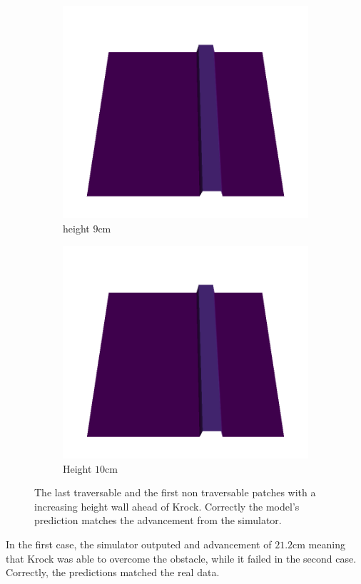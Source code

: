 \begin{figure}[H]
\begin{subfigure}[b]{0.33\textwidth}
    \end{subfigure}   
    \begin{subfigure}[b]{0.33\textwidth}
        \includegraphics[width=\linewidth]{../img/5/custom_patches/walls_increasing/1-3d.png}
    \caption{height $9$cm}
    \end{subfigure}   
    \begin{subfigure}[b]{0.33\textwidth}
        \includegraphics[width=\linewidth]{../img/5/custom_patches/walls_increasing/2-3d}
        \caption{Height $10$cm}
    \end{subfigure}   
\caption{The last traversable and the first non traversable patches  with a increasing height wall ahead of Krock. Correctly the model's prediction matches the advancement from the simulator.}    
\end{figure}
In the first case, the simulator outputed and advancement of $21.2$cm meaning that Krock was able to overcome the obstacle, while it failed in the second case. Correctly, the predictions matched the real data.

